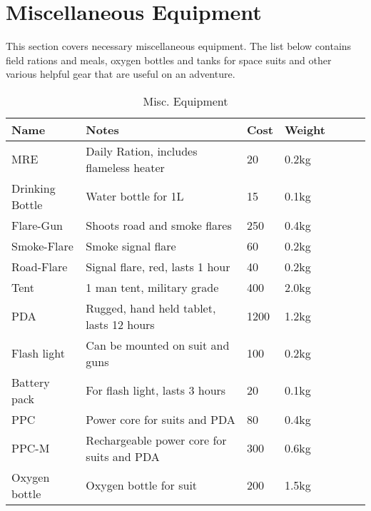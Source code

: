 \section{Miscellaneous Equipment}
\label{sec:10-Miscellanous Equipment}

This section covers necessary miscellaneous equipment. The list below contains
field rations and meals, oxygen bottles and tanks for space suits and other
various helpful gear that are useful on an adventure.

\begin{table}
  \caption{Misc. Equipment}
  \label{tab:MiscEquipment}
  \begin{center}
    \begin{tabular}{| l | l | l | l | l | l | l |}

      \hline
      \textbf{Name} & \textbf{Notes} & \textbf{Cost} & \textbf{Weight} \\ \hline

      MRE             & Daily Ration, includes flameless heater  &   20 & 0.2kg \\ \hline
      Drinking Bottle & Water bottle for 1L                      &   15 & 0.1kg \\ \hline

      Flare-Gun       & Shoots road and smoke flares             &  250 & 0.4kg \\ \hline
      Smoke-Flare     & Smoke signal flare                       &   60 & 0.2kg \\ \hline
      Road-Flare      & Signal flare, red, lasts 1 hour          &   40 & 0.2kg \\ \hline

      Tent            & 1 man tent, military grade               &  400 & 2.0kg \\ \hline

      PDA             & Rugged, hand held tablet, lasts 12 hours & 1200 & 1.2kg \\ \hline

      Flash light     & Can be mounted on suit and guns          &  100 & 0.2kg \\ \hline

      Battery pack    & For flash light, lasts 3 hours           &   20 & 0.1kg \\ \hline
      PPC             & Power core for suits and PDA             &   80 & 0.4kg \\ \hline
      PPC-M           & Rechargeable power core for suits and PDA & 300 & 0.6kg \\ \hline
      Oxygen bottle   & Oxygen bottle for suit                   &  200 & 1.5kg \\ \hline

    \end{tabular}
  \end{center}
\end{table}
